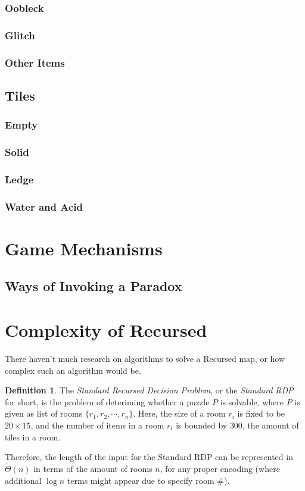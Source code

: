 \documentclass[a4paper]{article}
\theoremstyle{definition}
\newtheorem{definition}{Definition}[section]
\begin{document}
\subsubsection{Oobleck}
\subsubsection{Glitch}
\subsubsection{Other Items}

\subsection{Tiles}
\subsubsection{Empty}
\subsubsection{Solid}
\subsubsection{Ledge}
\subsubsection{Water and Acid}

\section{Game Mechanisms}
\subsection{Ways of Invoking a Paradox}

\section{Complexity of Recursed}
There haven't much research on algorithms to solve a Recursed map, or how complex such an algorithm would be.
\begin{definition}
The \emph{Standard Recursed Decision Problem}, or the \emph{Standard RDP} for short, is the problem of deteriming
whether a puzzle $P$ is solvable, where $P$ is given as list of rooms $\{r_1, r_2, \cdots, r_n\}$.
Here, the size of a room $r_i$ is fixed to be $20 \times 15$, and the number of items in a room $r_i$ is bounded by
$300$, the amount of tiles in a room.
\end{definition}
Therefore, the length of the input for the Standard RDP can be represented in $\tilde{\Theta}(n)$ in terms of the amount
of rooms $n$, for any proper encoding (where additional $\log n$ terms might appear due to specify room \#).
\end{document}
